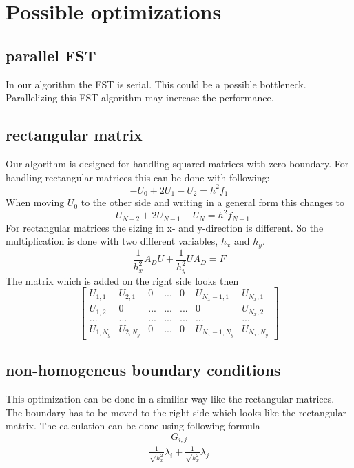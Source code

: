 \documentclass{article}
\begin{document}



\section{Possible optimizations}
\subsection{parallel FST}
In our algorithm the FST is serial. This could be a possible bottleneck. Parallelizing this FST-algorithm may increase the performance.
\subsection{rectangular matrix}
Our algorithm is designed for handling squared matrices with zero-boundary. For handling rectangular matrices this can be done with following:
\begin{equation}
-U_0+2U_1-U_2=h^2f_1
\end{equation}
When moving $U_0$ to the other side and writing in a general form this changes to
\begin{equation}
-U_{N-2}+2U_{N-1}-U_N=h^2f_{N-1}
\end{equation}
For rectangular matrices the sizing in x- and y-direction is different. So the multiplication is done with two different variables, $h_x$ and $h_y$.
\begin{equation}
\frac{1}{h_x^2}A_DU+\frac{1}{h_y^2}UA_D=F
\end{equation}
The matrix which is added on the right side looks then
$$
\begin{bmatrix}
U_{1,1} & U_{2,1} & 0 & ... & 0 & U_{N_x-1,1} & U_{N_x,1} \\
U_{1,2} & 0 & ... & ... & ... & 0 & U_{N_x,2} \\
... & ... & ... & ... &... & ... & ... \\
U_{1,N_y} & U_{2,N_y} & 0 & ... & 0 & U_{N_x-1,N_y} & U_{N_x,N_y} 
\end{bmatrix}
$$
\subsection{non-homogeneus boundary conditions}
This optimization can be done in a similiar way like the rectangular matrices. The boundary has to be moved to the right side which looks like the rectangular matrix. The calculation can be done using following formula
\begin{equation}
\frac{G_{i,j}}{\frac{1}{\sqrt{h_x^2}}\lambda_i+\frac{1}{\sqrt{h_x^2}}\lambda_j}
\end{equation}
\newpage
\end{document}

